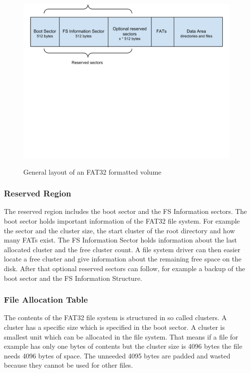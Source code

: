 \begin{figure}[h!]
\caption{General layout of an FAT32 formatted volume}
\centering
\includegraphics[scale=0.62]{figures/fat_general}
\label{figure:general_fat32_layout}
\end{figure}


\subsubsection{Reserved Region}

The reserved region includes the boot sector and the FS Information sectors. The boot sector holds important information of the FAT32 file system. For example the sector and the cluster size, the start cluster of the root directory and how many FATs exist. The FS Information Sector holds information about the last allocated cluster and the free cluster count. A file system driver can then easier locate a free cluster and give information about the remaining free space on the disk. After that optional reserved sectors can follow, for example a backup of the boot sector and the FS Information Structure\cite{usb_ms_jan}.

\subsubsection{File Allocation Table}

The contents of the FAT32 file system is structured in so called clusters. A cluster has a specific size which is specified in the boot sector. A cluster is smallest unit which can be allocated in the file system. That means if a file for example has only one bytes of contents but the cluster size is 4096 bytes the file needs 4096 bytes of space. The unneeded 4095 bytes are padded and wasted because they cannot be used for other files.

